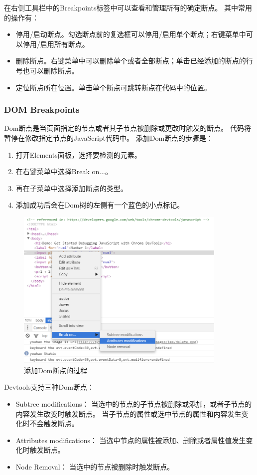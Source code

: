 在右侧工具栏中的Breakpoints标签中可以查看和管理所有的确定断点。
其中常用的操作有：
\begin{itemize}
\item 停用/启动断点。勾选断点前的复选框可以停用/启用单个断点；右键菜单中可以停用/启用所有断点。
\item 删除断点。右键菜单中可以删除单个或者全部断点；单击已经添加的断点的行号也可以删除断点。
\item 定位断点所在位置。单击单个断点可跳转断点在代码中的位置。
\end{itemize}

\subsubsection{DOM Breakpoints}
Dom断点是当页面指定的节点或者其子节点被删除或更改时触发的断点。
代码将暂停在修改指定节点的JavaScript代码中。
添加Dom断点的步骤是：
\begin{enumerate}
\item 打开Elements面板，选择要检测的元素。
\item 在右键菜单中选择Break on...。
\item 再在子菜单中选择添加断点的类型。
\item 添加成功后会在Dom树的左侧有一个蓝色的小点标记。
\end{enumerate}

\begin{figure}[H] 
\centering 
\includegraphics[width=0.9\textwidth]{image/devtools_study/add_dom_breakpoint.png} 
\caption{添加Dom断点的过程} \label{fig:add_dom_breakpoint} 
\end{figure}

Devtools支持三种Dom断点：
\begin{itemize}
\item Subtree modifications： 当选中的节点的子节点被删除或添加，或者子节点的内容发生改变时触发断点。
当子节点的属性或选中节点的属性和内容发生变化时不会触发断点。
\item Attributes modifications： 当选中节点的属性被添加、删除或者属性值发生变化时触发断点。
\item Node Removal： 当选中的节点被删除时触发断点。
\end{itemize}


